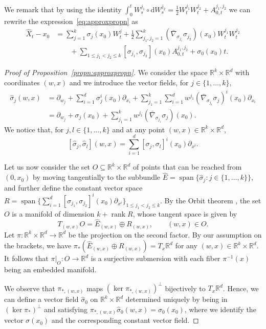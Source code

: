 \documentclass[10pt]{amsart}
\theoremstyle{remark}
\DeclareMathOperator{\rank}{rank}
\DeclareMathOperator{\spn}{span}
\newcommand{\R}{\mathbb{R}}
\newcommand{\db}{{\mathrm d}}
\numberwithin{equation}{section}
\begin{document}
We remark that by using the identity $\int_0^t W_s^{j_1} \circ \db W_s^{j_2} = \frac{1}{2} W_t^{j_1} W_t^{j_2} + A^{j_1,j_2}_{0,t}$ we can rewrite the expression~\eqref{eq:approxpropn} as
\begin{align*}
\hat X_t - x_{0} & = \sum_{j=1}^k \sigma_{j}(x_0) W_t^j + \frac{1}{2} \sum_{j_1,j_2=1}^k  (\bar{\nabla}_{\sigma_{j_1}}\sigma_{j_2})(x_0) W_t^{j_1} W_t^{j_2} \\
& \qquad + \sum_{1\leq j_1<j_2\leq k}  [\sigma_{j_1},\sigma_{j_2}](x_0) A^{j_1,j_2}_{0,t} + \sigma_0(x_0)t.
\end{align*}


\begin{proof}[Proof of Proposition~\ref{propn:approxpropn}]
We consider the space $\R^k \times \R^d$ with coordinates $(w,x)$ and we introduce the vector fields, for $j\in\{1,\dots,k\}$,
\begin{align*}
\hat \sigma_j(w,x) & = \partial_{w_j} + \sum_{i=1}^d \sigma_{j}^i(x_0) \partial_{x_i} + \sum_{j_1=1}^k \sum_{i=1}^d w^{j_1}(\bar{\nabla}_{\sigma_{j_1}}\sigma_{j})^i(x_0) \partial_{x_i} \\
& = \partial_{w_j} +\sigma_j(x_0)  + \sum_{j_1=1}^k w^{j_1} (\bar{\nabla}_{\sigma_{j_1}}\sigma_{j})(x_0).
\end{align*}
We notice that, for $j,l\in\{1,\dots,k\}$ and at any point $(w,x)\in \R^k \times \R^d$,
$$[\hat \sigma_j, \hat \sigma_{l}](w,x) = \sum_{i=1}^d [ \sigma_j, \sigma_{l}]^i(x_0) \partial_{x^i}.$$

Let us now consider the set $O\subseteq \R^k \times \R^d$ of points that can be reached from $(0,x_0)$ by moving tangentially to the subbundle $\hat E = \spn\{ \hat \sigma_j:j\in\{1,\dots,k\}\}$, and further define the constant vector space $R = \spn\{ \sum_{i=1}^d [\sigma_{j_1}, \sigma_{j_2}]^i(x_0) \partial_{x^i}\}_{1\leq j_1 < j_2\leq k}$. By the Orbit theorem \cite{sussmann1973orbits}, the set $O$ is a manifold of dimension $k + \rank R$, whose tangent space is given by
$$T_{(w,x)}O = \hat E_{(w,x)} \oplus R_{(w,x)}, \qquad (w,x) \in O.$$ 
Let $\pi\colon \R^k \times \R^d \to \R^d$ be the projection on the second factor. By our assumption on the brackets, we have $\pi_* (\hat E_{(w,x)}\oplus R_{(w,x)}) = T_x \R^d$ for any $(w,x) \in \R^k \times \R^d$. It follows that $\pi|_O\colon O \to \R^d$ is a surjective submersion with each fiber $\pi^{-1}(x)$ being an embedded manifold.

We observe that $\pi_{*,(w,x)}$ maps $(\ker \pi_{*,(w,x)})^\perp$ bijectively to $T_x\R^d$. Hence, we can define a vector field $\hat \sigma_0$ on $\R^k \times \R^d$ determined uniquely by being in $(\ker \pi_*)^\perp$ and satisfying $\pi_{*,(w,x)} \hat \sigma_0(w,x) = \sigma_0(x_0)$, where we identify the vector $\sigma(x_0)$ and the corresponding constant vector field.


\end{proof}
\end{document}
